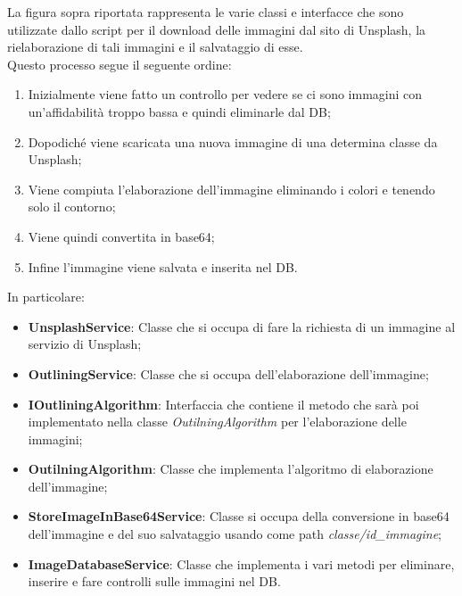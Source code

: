 La figura sopra riportata rappresenta le varie classi e interfacce che sono utilizzate dallo script per il download delle immagini dal sito di Unsplash, la rielaborazione di tali immagini e il salvataggio di esse.\\ Questo processo segue il seguente ordine:
\begin{enumerate}
	\item Inizialmente viene fatto un controllo per vedere se ci sono immagini con un'affidabilità troppo bassa e quindi eliminarle dal DB;
    \item Dopodiché viene scaricata una nuova immagine di una determina classe da Unsplash;
    \item Viene compiuta l'elaborazione dell'immagine eliminando i colori e tenendo solo il contorno;
    \item Viene quindi convertita in base64;
    \item Infine l'immagine viene salvata e inserita nel DB.
\end{enumerate}
\newpage
In particolare:
\begin{itemize}
    \item \textbf{UnsplashService}: Classe che si occupa di fare la richiesta di un immagine al servizio di Unsplash;
    \item \textbf{OutliningService}: Classe che si occupa dell'elaborazione dell'immagine;
    \item \textbf{IOutliningAlgorithm}: Interfaccia che contiene il metodo che sarà poi implementato nella classe \textit{OutilningAlgorithm} per l'elaborazione delle immagini;
    \item \textbf{OutilningAlgorithm}: Classe che implementa l'algoritmo di elaborazione dell'immagine;
    \item \textbf{StoreImageInBase64Service}: Classe si occupa della conversione in base64 dell'immagine e del suo salvataggio usando come path \textit{classe/id\_immagine};
    \item \textbf{ImageDatabaseService}: Classe che implementa i vari metodi per eliminare, inserire e fare controlli sulle immagini nel DB.
\end{itemize}
\newpage
